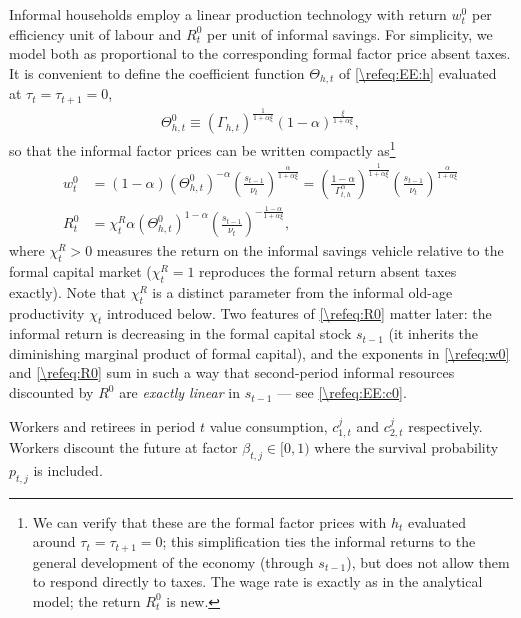 \documentclass[a4paper]{article}
\begin{document}
\bigskip
Informal households employ a linear production technology with return $w_t^0$ per efficiency unit of labour and $R_t^0$ per unit of informal savings. For simplicity, we model both as proportional to the corresponding formal factor price absent taxes. It is convenient to define the coefficient function $\Theta_{h,t}$ of \eqref{\refeq:EE:h} evaluated at $\tau_t = \tau_{t+1} = 0$,
\begin{align}\label{\refeq:Theta0}
    \Theta_{h,t}^0 \equiv \left(\Gamma_{h,t}\right)^{\frac{1}{1+\alpha\xi}}\left(1-\alpha\right)^{\frac{\xi}{1+\alpha\xi}},
\end{align}
so that the informal factor prices can be written compactly as\footnote{We can verify that these are the formal factor prices with $h_t$ evaluated around $\tau_t = \tau_{t+1} = 0$; this simplification ties the informal returns to the general development of the economy (through $s_{t-1}$), but does not allow them to respond directly to taxes. The wage rate is exactly as in the analytical model; the return $R_t^0$ is new.}
\begin{align}
    w_t^0 &= (1-\alpha)\left(\Theta_{h,t}^0\right)^{-\alpha}\left(\frac{s_{t-1}}{\nu_t}\right)^{\frac{\alpha}{1+\alpha\xi}} = \left(\frac{1-\alpha}{\Gamma_{t,h}^{\alpha}}\right)^{\frac{1}{1+\alpha\xi}} \left(\frac{s_{t-1}}{\nu_t}\right)^{\frac{\alpha}{1+\alpha\xi}} \label{\refeq:w0} \\
    R_t^0 &= \chi_t^R\alpha \left(\Theta_{h,t}^0\right)^{1-\alpha}\left(\frac{s_{t-1}}{\nu_t}\right)^{-\frac{1-\alpha}{1+\alpha\xi}}, \label{\refeq:R0}
\end{align}
where $\chi_t^R>0$ measures the return on the informal savings vehicle relative to the formal capital market ($\chi_t^R = 1$ reproduces the formal return absent taxes exactly). Note that $\chi_t^R$ is a distinct parameter from the informal old-age productivity $\chi_t$ introduced below. Two features of \eqref{\refeq:R0} matter later: the informal return is decreasing in the formal capital stock $s_{t-1}$ (it inherits the diminishing marginal product of formal capital), and the exponents in \eqref{\refeq:w0} and \eqref{\refeq:R0} sum in such a way that second-period informal resources discounted by $R^0$ are \emph{exactly linear} in $s_{t-1}$ --- see \eqref{\refeq:EE:c0}.


Workers and retirees in period $t$ value consumption, $c_{1,t}^j$ and $c_{2,t}^j$ respectively. Workers discount the future at factor $\beta_{t,j}\in[0,1)$ where the survival probability $p_{t,j}$ is included.
\end{document}

